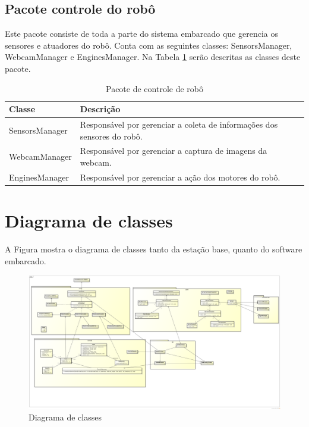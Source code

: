 \subsection{Pacote controle do robô}

Este pacote consiste de toda a parte do sistema embarcado que gerencia os sensores e atuadores do robô. Conta com as seguintes classes: SensorsManager, WebcamManager e EnginesManager. Na Tabela \ref{tab:pacote_controle_robo} serão descritas as classes deste pacote.

\begin{table}[h]
  \centering
  \caption{Pacote de controle de robô}
    \begin{tabular}{p{6cm}p{8cm}}
    \toprule
    \textbf{Classe} & \textbf{Descrição} \\ \hline
    \midrule
    SensorsManager & Responsável por gerenciar a coleta de informações dos sensores do robô. \\ \hline
    WebcamManager & Responsável por gerenciar a captura de imagens da webcam. \\ \hline
    EnginesManager & Responsável por gerenciar a ação dos motores do robô. \\ \hline
    \bottomrule
    \end{tabular}%
  \label{tab:pacote_controle_robo}%
\end{table}%



\section{Diagrama de classes}

A Figura \label{fig:diagrama_classes} mostra o diagrama de classes tanto da estação base, quanto do software embarcado.

\begin{figure}[H]
  \centering
  \includegraphics[width=\textwidth]{./figuras/diagrama_classes.png}
  \caption{Diagrama de classes}
  \label{fig:diagrama_classes}
\end{figure}
